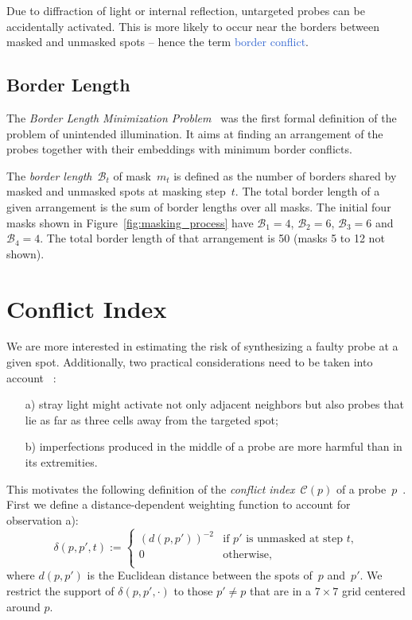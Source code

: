 \documentclass[portrait]{a0poster}
\begin{document}
\begin{multicols}{3}[\aggiheader]
\noindent Due to diffraction of light or internal reflection, untargeted probes
can be accidentally activated. This is more likely to occur near the borders
between masked and unmasked spots -- hence the term
\textcolor{highlight}{border conflict}.

\subsection*{Border Length}

\noindent The \emph{Border Length Minimization Problem}~\cite{HANNENHALLI02} was
the first formal definition of the problem of unintended illumination. It aims
at finding an arrangement of the probes together with their embeddings with
minimum border conflicts.

\noindent The \emph{border length}~$\mathcal{B}_t$ of mask~$m_{t}$ is defined as
the number of borders shared by masked and unmasked spots at masking step~$t$.
The total border length of a given arrangement is the sum of border lengths over
all masks. The initial four masks shown in Figure~\ref{fig:masking_process} have
$\mathcal{B}_1 = 4$, $\mathcal{B}_2 = 6$, $\mathcal{B}_3 = 6$ and
$\mathcal{B}_4 = 4$. The total border length of that arrangement is 50 (masks 5
to 12 not shown).

\section*{\textcolor{aggigreen}{Conflict Index}}

\noindent We are more interested in estimating the risk of synthesizing a faulty
probe at a given spot. Additionally, two practical considerations need to be
taken into account ~\cite{KAHNG03}:
\begin{itemize}
\item[a)] stray light might activate not only adjacent neighbors but also probes
that lie as far as three cells away from the targeted spot;
\item[b)] imperfections produced in the middle of a probe are more harmful than
in its extremities.
\end{itemize}

\noindent This motivates the following definition of the \emph{conflict
index}~$\mathcal{C}(p)$ of a probe~$p$~\cite{CARVALHO06}. First we define a
distance-dependent weighting function to account for observation a):
\begin{equation}
\label{eq:dist_weight}
\delta(p,p',t) :=
\left\{
        \begin{array}{ll}
                (d(p,p'))^{-2} & \mbox{if $p'$ is unmasked at step $t$}, \\
                0 & \mbox{otherwise}, \\
        \end{array}
\right.
\end{equation}
where $d(p,p')$ is the Euclidean distance between the spots of~$p$ and~$p'$.
We restrict the support of $\delta(p,p',\cdot)$ to those $p'\neq p$ that are in
a $7\times 7$ grid centered around $p$.


\end{multicols}
\end{document}
